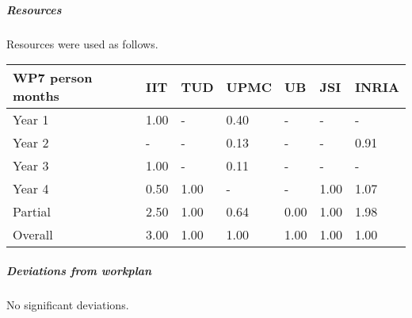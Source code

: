

\subparagraph*{Resources}

Resources were used as follows.

\begin{center}
\begin{tabular}{|C{1.5cm}|C{1.5cm}|C{1.5cm}|C{2cm}|C{2cm}|C{2cm}|C{2cm}|}
\hline
\footnotesize \textbf{WP7 person months}& \footnotesize \textbf{IIT}&\footnotesize \textbf{TUD}&\footnotesize \textbf{UPMC}& \footnotesize \textbf{UB} &\footnotesize \textbf{JSI} & \footnotesize \textbf{INRIA} \\ \hline
\footnotesize Year 1 &  1.00 & -    & 0.40 & -    & -    & - \\  \hline
\footnotesize Year 2 &  -    & -    & 0.13 & -    & -    & 0.91 \\  \hline
\footnotesize Year 3 &  1.00 & - & 0.11 & - & - & - \\ \hline
\footnotesize Year 4  & 0.50  &  1.00 &  -    &  -     &  1.00  &  1.07    \\  \hline
\footnotesize Partial & 2.50 &  1.00 &  0.64 &  0.00 &  1.00 &  1.98    \\
\hline \hline
\footnotesize Overall & 3.00 & 1.00 & 1.00 & 1.00 & 1.00 & 1.00 \\ \hline
\end{tabular}
\end{center}

\subparagraph*{Deviations from workplan} 
No significant deviations. 
